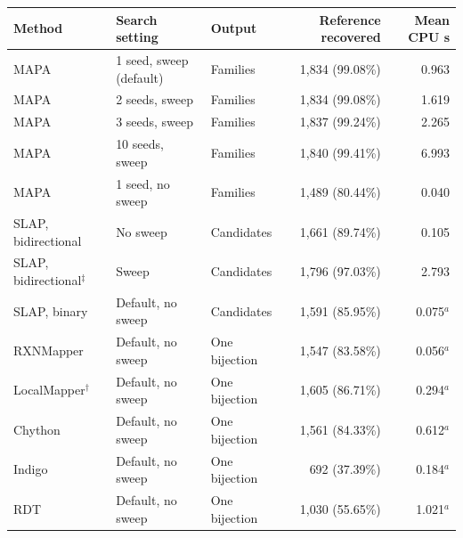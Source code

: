 \begin{tabular}{@{}lllr r@{}}\toprule
Method & Search setting & Output & Reference recovered & Mean CPU s\\\midrule
MAPA & 1 seed, sweep (default) & Families & 1,834 (99.08\%) & 0.963 \\
MAPA & 2 seeds, sweep & Families & 1,834 (99.08\%) & 1.619 \\
MAPA & 3 seeds, sweep & Families & 1,837 (99.24\%) & 2.265 \\
MAPA & 10 seeds, sweep & Families & 1,840 (99.41\%) & 6.993 \\
MAPA & 1 seed, no sweep & Families & 1,489 (80.44\%) & 0.040 \\
SLAP, bidirectional & No sweep & Candidates & 1,661 (89.74\%) & 0.105 \\
SLAP, bidirectional$^{\ddagger}$ & Sweep & Candidates & 1,796 (97.03\%) & 2.793 \\
SLAP, binary & Default, no sweep & Candidates & 1,591 (85.95\%) & 0.075$^{a}$ \\
RXNMapper & Default, no sweep & One bijection & 1,547 (83.58\%) & 0.056$^{a}$ \\
LocalMapper$^{\dagger}$ & Default, no sweep & One bijection & 1,605 (86.71\%) & 0.294$^{a}$ \\
Chython & Default, no sweep & One bijection & 1,561 (84.33\%) & 0.612$^{a}$ \\
Indigo & Default, no sweep & One bijection & 692 (37.39\%) & 0.184$^{a}$ \\
RDT & Default, no sweep & One bijection & 1,030 (55.65\%) & 1.021$^{a}$ \\
\bottomrule\end{tabular}
